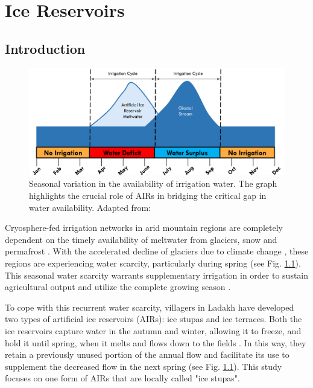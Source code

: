 \chapter{Ice Reservoirs}

\section{Introduction}

\begin{figure}[t]
\centering
\includegraphics[width=12cm]{Figures/irrigation_cycles.png}

\caption{Seasonal variation in the availability of irrigation water. The graph highlights the crucial role of
AIRs in bridging the critical gap in water availability. Adapted from: \cite{nusserLocalKnowledgeGlobal2016}}

\label{fig:irrigation_cycles}
\end{figure}

Cryosphere-fed irrigation networks in arid mountain regions are completely dependent on the timely availability of
meltwater from glaciers, snow and permafrost \citep{immerzeelImportanceVulnerabilityWorld2020,
farhanHydrologicalRegimesConjunction2015, tveitenGlacierGrowingLocal2007}. With the accelerated decline of
glaciers due to climate change \citep{nusserLocalKnowledgeGlobal2016}, these regions are experiencing water
scarcity, particularly during spring \citep{norphelSnowWaterHarvesting2015,
mukhopadhyayReevaluationSnowmeltGlacial2015} (see Fig. \ref{fig:irrigation_cycles}). This seasonal water
scarcity warrants supplementary irrigation in order to sustain agricultural output and utilize the complete growing season \citep{nusserLocalKnowledgeGlobal2016, vincentEnergyClimateChange2009}.

To cope with this recurrent water scarcity, villagers in Ladakh have developed two types of
artificial ice reservoirs (AIRs): ice stupas and ice terraces. Both the ice reservoirs capture water
in the autumn and winter, allowing it to freeze, and hold it until spring, when it melts and flows down to
the fields \citep{ipccChapterHighMountain2019, vinceGlacierMan2009, clouseLadakhArtificialGlaciers2017,
nusserSociohydrologyArtificialGlaciers2019}. In this way, they retain a previously unused portion of the annual
flow and facilitate its use to supplement the decreased flow in the next spring (see Fig.
\ref{fig:irrigation_cycles}). This study focuses on one form of AIRs that are locally called "ice stupas".

